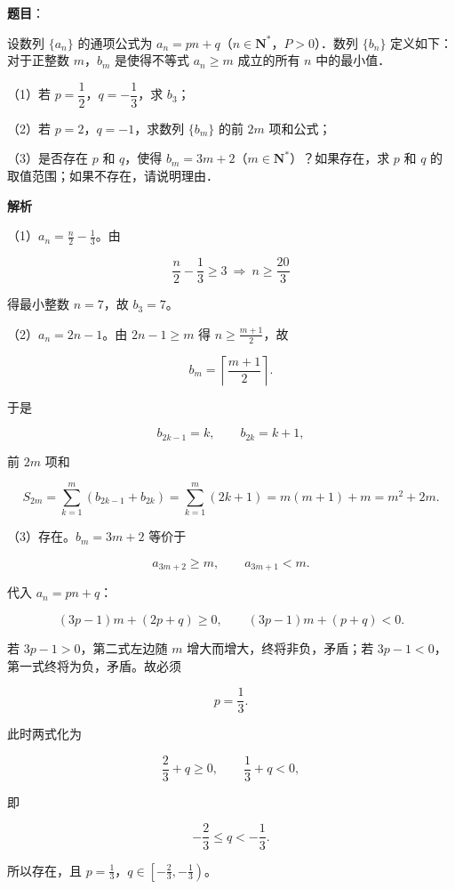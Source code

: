 \begin{answer}

\textbf{题目}：

设数列 $\{a_n\}$ 的通项公式为 $a_n=pn+q$（$n\in\mathbf N^*$，$P>0$）．数列 $\{b_n\}$ 定义如下：对于正整数 $m$，$b_m$ 是使得不等式 $a_n\geqslant m$ 成立的所有 $n$ 中的最小值．

（1）若 $p=\dfrac12$，$q=-\dfrac13$，求 $b_3$；

（2）若 $p=2$，$q=-1$，求数列 $\{b_m\}$ 的前 $2m$ 项和公式；

（3）是否存在 $p$ 和 $q$，使得 $b_m=3m+2$（$m\in\mathbf N^*$）？如果存在，求 $p$ 和 $q$ 的取值范围；如果不存在，请说明理由．

\textbf{解析}

（1）$a_n=\frac n2-\frac13$。由

\nopagebreak[4]
\[\frac n2-\frac13\geqslant3\ \Longrightarrow\ n\geqslant\frac{20}{3}\]

得最小整数 $n=7$，故 $b_3=7$。

（2）$a_n=2n-1$。由 $2n-1\geqslant m$ 得 $n\geqslant\frac{m+1}{2}$，故

\nopagebreak[4]
\[b_m=\left\lceil\frac{m+1}{2}\right\rceil .\]

于是

\nopagebreak[4]
\[b_{2k-1}=k,\qquad b_{2k}=k+1,\]

前 $2m$ 项和

\nopagebreak[4]
\[S_{2m}=\sum_{k=1}^{m}(b_{2k-1}+b_{2k})
=\sum_{k=1}^{m}(2k+1)=m(m+1)+m=m^2+2m .\]

（3）存在。$b_m=3m+2$ 等价于

\nopagebreak[4]
\[a_{3m+2}\geqslant m,\qquad a_{3m+1}<m .\]

代入 $a_n=pn+q$：

\nopagebreak[4]
\[(3p-1)m+(2p+q)\geqslant0,\qquad
(3p-1)m+(p+q)<0 .\]

若 $3p-1>0$，第二式左边随 $m$ 增大而增大，终将非负，矛盾；若 $3p-1<0$，第一式终将为负，矛盾。故必须

\nopagebreak[4]
\[p=\frac13 .\]

此时两式化为

\nopagebreak[4]
\[\frac23+q\geqslant0,\qquad \frac13+q<0,\]

即

\nopagebreak[4]
\[-\frac23\leqslant q<-\frac13 .\]

所以存在，且 $p=\frac13$，$q\in\left[-\frac23,-\frac13\right)$。

\gkanswer{答案：（1）$b_3=7$；（2）$m^2+2m$；（3）存在，$p=\frac13$，$q\in\left[-\frac23,-\frac13\right)$。}

\end{answer}